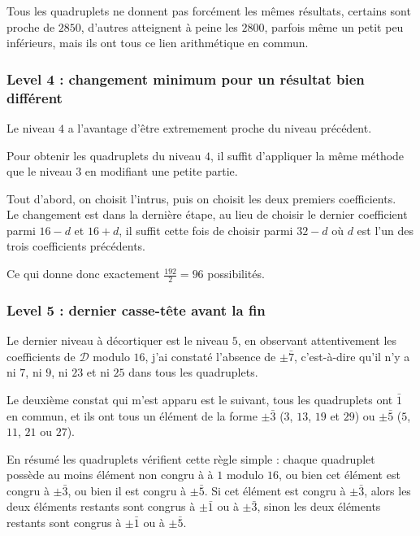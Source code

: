 \documentclass[12pt, a4paper]{memoir}
\begin{document}
  \begin{Remarque}
   Tous les quadruplets ne donnent pas forcément les mêmes résultats, certains sont proche de $2850$, d'autres
   atteignent à peine les $2800$, parfois même un petit peu inférieurs, mais ils ont tous ce lien arithmétique
   en commun.
  \end{Remarque}

  \subsubsection{Level 4 : changement minimum pour un résultat bien différent}
  
  Le niveau $4$ a l'avantage d'être extremement proche du niveau précédent.
  
  Pour obtenir les quadruplets du niveau $4$, il suffit d'appliquer la même méthode que le niveau $3$ en 
  modifiant une petite partie.
  
  Tout d'abord, on choisit l'intrus, puis on choisit les deux premiers coefficients. \\
  Le changement est dans la dernière étape, au lieu de choisir le dernier coefficient parmi $16-d$ et 
  $16+d$, il suffit cette fois de choisir parmi $32-d$ où $d$ est l'un des trois coefficients précédents.
  
  Ce qui donne donc exactement $\frac{192}{2} = 96$ possibilités.
  
  \subsubsection{Level 5 : dernier casse-tête avant la fin}
  
  Le dernier niveau à décortiquer est le niveau $5$, en observant attentivement les coefficients de $\mathcal{D}$ modulo $16$,
  j'ai constaté l'absence de $\pm \bar{7}$, c'est-à-dire qu'il n'y a ni $7$, ni $9$, ni $23$ et ni $25$ dans tous les quadruplets.
  
  Le deuxième constat qui m'est apparu est le suivant, tous les quadruplets ont $\bar{1}$ en commun, et ils
  ont tous un élément de la forme $\pm \bar{3}$ ($3$, $13$, $19$ et $29$) ou $\pm \bar{5}$ ($5$, $11$, $21$ ou $27$).
  
  En résumé les quadruplets vérifient cette règle simple : chaque quadruplet possède au moins élément non congru à
  à $1$ modulo $16$, ou bien cet élément est congru à $\pm \bar{3}$, ou bien il est congru à $\pm \bar{5}$.
  Si cet élément est congru à $\pm \bar{3}$, alors les deux éléments restants sont congrus à $\pm \bar{1}$
  ou à $\pm \bar{3}$, sinon les deux éléments restants sont congrus à $\pm \bar{1}$ ou à $\pm \bar{5}$.
 
\end{document}
